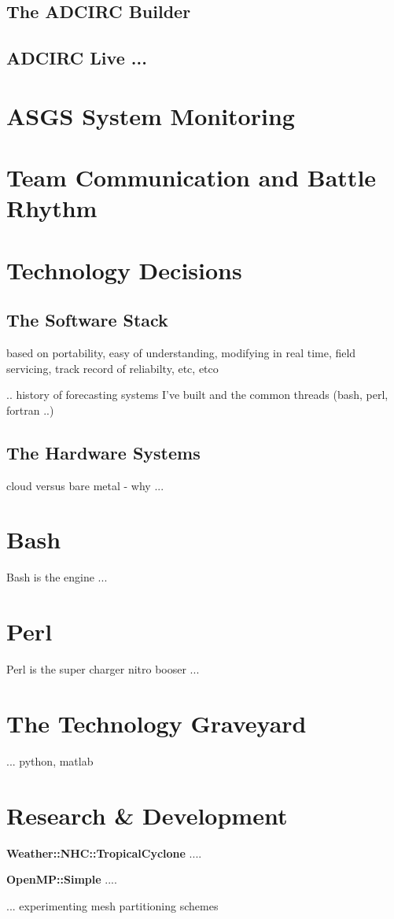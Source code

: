 \documentclass{article}
\begin{document}
\subsection{The ADCIRC Builder}

\subsection{ADCIRC Live ...}

\section{ASGS System Monitoring}

\section{Team Communication and Battle Rhythm}

\section{Technology Decisions}

\subsection{The Software Stack}

based on portability, easy of understanding, modifying in real time, field
servicing, track record of reliabilty, etc, etco

.. history of forecasting systems I've built and the common threads (bash,
perl, fortran ..)

\subsection{The Hardware Systems}

cloud versus bare metal - why ...

\section{Bash}

Bash is the engine ...

\section{Perl}

Perl is the super charger nitro booser ...

\section{The Technology Graveyard}

... python, matlab

\section{Research \& Development}

\textbf{Weather::NHC::TropicalCyclone} ....

\textbf{OpenMP::Simple} ....

... experimenting mesh partitioning schemes

\break

\end{document}

